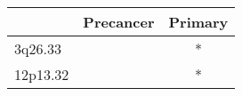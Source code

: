 \begin{tabular}{lcc}
\toprule
{} & Precancer & Primary \\
\midrule
3q26.33  &           &       * \\
12p13.32 &           &       * \\
\bottomrule
\end{tabular}
